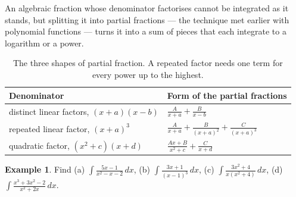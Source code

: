 \documentclass[11pt,a4paper]{article}
\theoremstyle{definition}
\newtheorem{example}[thm]{Example}
\begin{document}
An algebraic fraction whose denominator factorises cannot be integrated as it stands,
but splitting it into partial fractions --- the technique met earlier with polynomial functions --- turns it
into a sum of pieces that each integrate to a logarithm or a power.

\begin{table}[H]
\centering
\begin{tabular}{|l|l|}
\hline
Denominator & Form of the partial fractions\\
\hline
distinct linear factors, $(x+a)(x-b)$
 & $\frac{A}{x+a}+\frac{B}{x-b}$\\[4pt]
repeated linear factor, $(x+a)^3$
 & $\frac{A}{x+a}+\frac{B}{(x+a)^2}+\frac{C}{(x+a)^3}$\\[4pt]
quadratic factor, $\left(x^2+c\right)(x+d)$
 & $\frac{Ax+B}{x^2+c}+\frac{C}{x+d}$\\
\hline
\end{tabular}
\caption{The three shapes of partial fraction. A repeated factor needs one term for every power up to the highest.}
\end{table}

\begin{example}
Find \quad (a) $\displaystyle\int\frac{5x-1}{x^2-x-2}\,dx$, \quad
(b) $\displaystyle\int\frac{3x+1}{(x-1)^3}\,dx$, \quad
(c) $\displaystyle\int\frac{3x^2+4}{x\left(x^2+4\right)}\,dx$, \quad
(d) $\displaystyle\int\frac{x^3+3x^2-2}{x^2+2x}\,dx$.
\end{example}
\end{document}

